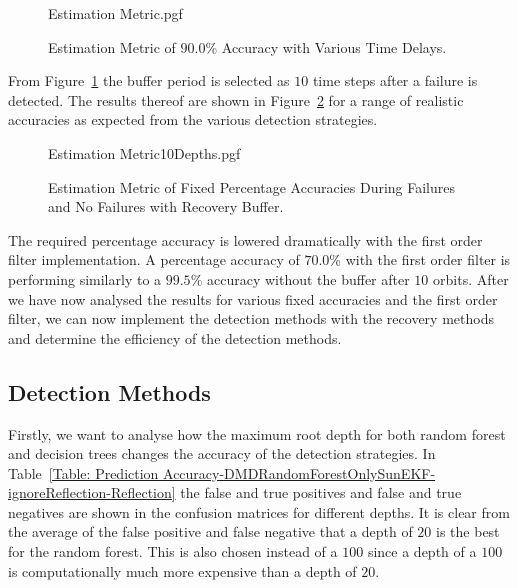 \documentclass[letterpaper, 10 pt, conference]{ieeeconf}  %
\begin{document}
\begin{figure}[!htb]
	\begin{center}
		{Estimation Metric.pgf}
	\end{center}
	\caption[Estimation Metric of $90.0\%$ Accuracy with Various Time Delays]{Estimation Metric of $90.0\%$ Accuracy with Various Time Delays.}
	\label{fig:Prediction Accuracy 90.0 with various steps summary}
\end{figure}

From Figure~\ref{fig:Prediction Accuracy 90.0 with various steps summary} the buffer period is selected as $10$ time steps after a failure is detected. The results thereof are shown in Figure~\ref{fig:Estimation Accuracy EKF-ignore with Recovery Buffer} for a range of realistic accuracies as expected from the various detection strategies. 

\begin{figure}[!htb]
	\begin{center}
		{Estimation Metric10Depths.pgf}
	\end{center}
	\caption[Estimation Metric of Fixed Percentage Accuracies During Failures and No Failures with Recovery Buffer]{Estimation Metric of Fixed Percentage Accuracies During Failures and No Failures with Recovery Buffer.}
	\label{fig:Estimation Accuracy EKF-ignore with Recovery Buffer}
\end{figure}

The required percentage accuracy is lowered dramatically with the first order filter implementation. A percentage accuracy of $70.0\%$ with the first order filter is performing similarly to a $99.5\%$ accuracy without the buffer after $10$ orbits. After we have now analysed the results for various fixed accuracies and the first order filter, we can now implement the detection methods with the recovery methods and determine the efficiency of the detection methods.

\subsection{Detection Methods}
Firstly, we want to analyse how the maximum root depth for both random forest and decision trees changes the accuracy of the detection strategies. In Table~\ref{Table: Prediction Accuracy-DMDRandomForestOnlySunEKF-ignoreReflection-Reflection} the false and true positives and false and true negatives are shown in the confusion matrices for different depths. It is clear from the average of the false positive and false negative that a depth of $20$ is the best for the random forest. This is also chosen instead of a $100$ since a depth of a $100$ is computationally much more expensive than a depth of $20$.
\end{document}
